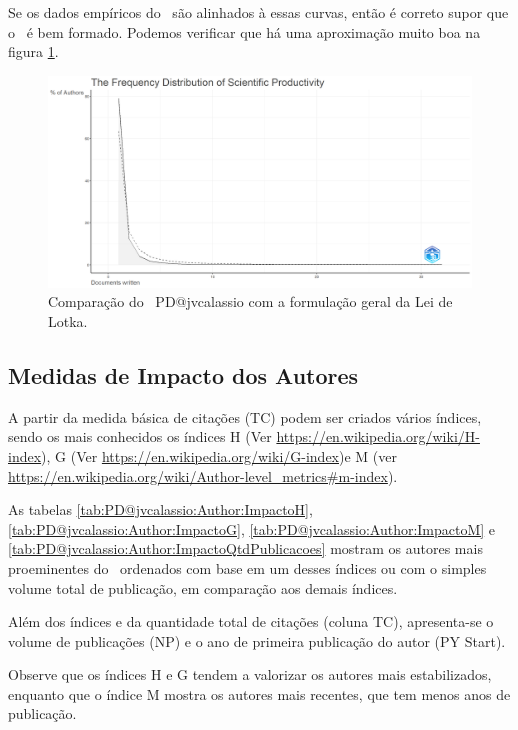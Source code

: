 Se os dados empíricos do \dataset\ são alinhados à essas curvas, então é correto supor que o \dataset\ é bem formado. Podemos verificar que há uma aproximação muito boa na figura \ref{fig:PD@jvcalassio:Author:Lotka}.

\begin{figure}
    \centering
    \includegraphics[width=1\textwidth]{exploratory-data-analysis/jvcalassio/PesqBibliogr/PrisonersDilemma/WoS-20221201/Dataset/LotkaLaw-2022-12-03.png}
    \caption{Comparação do \dataset\ PD@jvcalassio com a formulação geral da Lei de Lotka.}
    \label{fig:PD@jvcalassio:Author:Lotka}
\end{figure}

\subsection{Medidas de Impacto dos Autores}

A partir da medida básica de citações (TC) podem ser criados vários índices, sendo os mais conhecidos os índices H (Ver \url{https://en.wikipedia.org/wiki/H-index}), G (Ver \url{https://en.wikipedia.org/wiki/G-index})e M (ver \url{https://en.wikipedia.org/wiki/Author-level_metrics#m-index}).

As tabelas \ref{tab:PD@jvcalassio:Author:ImpactoH}, \ref{tab:PD@jvcalassio:Author:ImpactoG}, \ref{tab:PD@jvcalassio:Author:ImpactoM} e \ref{tab:PD@jvcalassio:Author:ImpactoQtdPublicacoes} mostram os autores mais proeminentes do \dataset\ ordenados com base em um desses índices ou com o simples volume total de publicação, em comparação aos demais índices.

Além dos índices e da quantidade total de citações (coluna TC), apresenta-se o volume de publicações (NP) e o ano de primeira publicação do autor (PY Start).

Observe que os índices H e G tendem a valorizar os autores mais estabilizados, enquanto que o índice M mostra os autores mais recentes, que tem menos anos de publicação.

